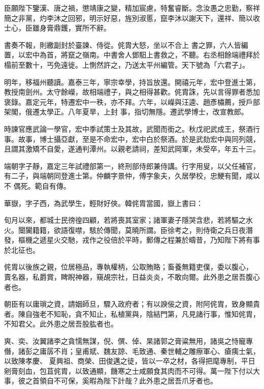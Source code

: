 \begin{pinyinscope}
 臣願陛下鑒漢、唐之禍，懲靖康之變，精加宸慮，特奮睿斷。念汝愚之忠勤，察祥簡之非黨，灼李沐之回邪，明示好惡，旌別淑慝，竄李沐以謝天下，還祥、簡以收士心，臣雖身膏鼎鑊，實所不辭。



 書奏不報，則繳副封於臺諫、侍從。侂胄大怒，坐以不合上
 書之罪，六人皆編置，以宏中為首，將竄之嶺南。中書舍人鄧馹上書救之，不聽。右丞相餘端禮拜於榻前至數十，丐免遠徙。上惻然許之，乃送太平州編管。天下號為「六君子」。



 明年，移福州聽讀。嘉泰三年，寧宗幸學，持旨放還。開禧元年，宏中登進士第，教授南劍州。太守餘嶸，故相端禮子，與之相得甚歡。侂胄誅，先以言得罪者悉加褒錄。嘉定元年，特遷宏中一秩，亦不拜。六年，以嶸與汪逵、趙彥橚薦，授戶部架閣，俄遷太學正。八年夏旱，上封
 事，指切無隱。遷武學博士，改宣教郎。



 時諫官應武論一學官，宏中季試策士及其故，武聞而銜之。秋戊祀武成王，祭酒行事。故事，博士攝亞獻，至是不命宏中，宏中白於祭酒。於是武劾宏中與同列競，且謂其激矯不自愛，遂通判潭州。以親老請祠，差知武岡軍，未受卒，年五十三。



 端朝字子靜，嘉定三年試禮部第一，終刑部侍郎兼侍講。行字用叟，以父任補官，有二子，與端朝同登進士第。仲麟字景仲，傅字象夫，久居學校，忠鯁有聞，咸以不
 偶死。範自有傳。



 華嶽，字子西，為武學生，輕財好俠。韓侂胄當國，嶽上書曰：



 旬月以來，都城士民徬徨四顧，若將喪其室家；諸軍妻子隱哭含悲，若將驅之水火。闤闠籍籍，欲語復噤，駭於傳聞，莫曉所謂。臣徐考之，則侍衛之兵日夜潛發，樞機之遞星火交馳，戎作之役倍於平時，郵傳之程兼於疇昔，乃知陛下將有事於北征也。



 侂胄以後族之親，位居極品，專執權柄，公取賄賂；畜養無籍吏僕，委以腹心，
 賣名器，私爵賞，睥睨神器，窺覘宗社，日益炎炎，不敢向爾。此外患之居吾腹心者也。



 朝臣有以庸瑣之資，請姻師旦，驟入政府者；有以諛佞之資，附阿侂胄，致身顯貴者。陳自強老不知恥，貪不知止，私植黨與，陰結門第，凡見諸行事，惟知侂胄，不知君父。此外患之居吾股肱者也。



 爽、奕、汝翼諸李之貪懦無謀，倪、僎、倬、杲諸郭之膏粱無用，諸吳之恃寵專僭，諸彭之庸孱不肖；皇甫斌、魏友諒、毛致通、秦世輔之雕瘵軍心、瘡痍士氣，以致陳孝慶、
 夏興祖、商榮、田俊邁之徒，皆以一卒之材，各得把麾專制，平日剜膏刻血，包苴侂胄，以致通顯，饑寒之士咸願食其肉而不可得。萬一陛下付以大事，彼之首領自不可保，奚暇為陛下計哉？此外患之居吾爪牙者也。




\end{pinyinscope}
